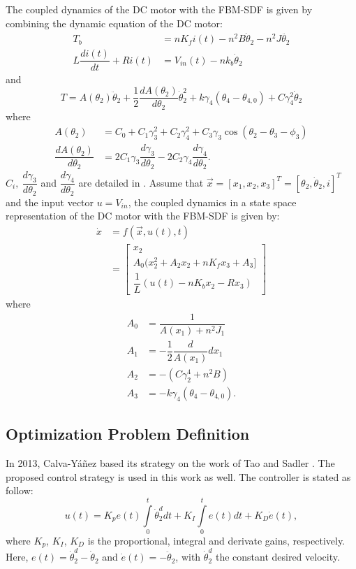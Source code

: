 \documentclass[12pt,letterpape]{article}
\begin{document}
The coupled dynamics of the DC motor with the FBM-SDF is given by combining  the
dynamic equation of the DC motor:
\begin{align}
	T_b &= nK_f i(t) - n^2 B \dot{\theta}_2 - n^2 J \ddot{\theta_2} \\
	L \dfrac{di(t)}{dt} + Ri(t) &= V_{in} (t) - nk_b \dot{\theta}_2
\end{align}
and
$$
	T = A( \theta_2 ) \ddot{\theta}_2 + \frac{1}{2} \dfrac{dA(\theta_2)}{d\theta_2}
	\dot{\theta}_2^2 + k \gamma_4 ( \theta_4 - \theta_{4,0} ) + C \gamma_4^2 \dot{\theta}_2
$$
% 
where
\begin{align}
	A(\theta_2) &=  C_0 + C_1 \gamma_3^2 + C_2 \gamma_4^2 + C_3 \gamma_3 \cos(\theta_2-\theta_3-\phi_3)\\
	\dfrac{dA(\theta_2)}{d\theta_2} &= 2C_1 \gamma_3 \dfrac{d \gamma_3}{d \theta_2} -2C_2 \gamma_4 \dfrac{d \gamma_4}{d \theta_2}.
\end{align}
$C_i,\ \dfrac{d \gamma_3}{d \theta_2}$ and $ \dfrac{d \gamma_4}{d \theta_2 } $ are
detailed in \cite{calva13}.
% 
Assume that $ \vec{x} = [x_1,x_2,x_3]^T = [ \theta_2, \dot{\theta}_2,i ]^T $ and
the input vector $u = V_{in}$, the coupled dynamics in a state space representation
of the DC motor with the FBM-SDF is given by:
\begin{align}
	\dot{x} &= f( \vec{x}, u(t), t ) \\
	&= 
	\begin{bmatrix}
		x_2\\
		A_0( x_2^2 + A_2 x_2 + nK_f x_3 + A_3 ]\\
		\dfrac{1}{L} (u(t) - n K_b x_2 - R x_3)
	\end{bmatrix}
\end{align}
% 
where
\begin{align}
	A_0 &= \dfrac{1}{A(x_1) + n^2 J_1} \\
	A_1 &= -\dfrac{1}{2} \dfrac{d}{A(x_1)}{dx_1} \\
	A_2 &= - (C \gamma_2^4 + n^2 B ) \\
	A_3 &= -k \gamma_4( \theta_4 - \theta_{4,0} ).
\end{align}

\subsection{Optimization Problem Definition} %
\label{sec:optimization_problem_definition}

In 2013, Calva-Y{\'a}{\~n}ez \cite{calva13} based its strategy on the work of Tao
and Sadler \cite{tao95}. The proposed control strategy is used in this work as well.
The controller is stated as follow:
%
%
\begin{equation}
	u(t) =  K_{p} e(t) \int\limits_{0}^{t} \dot{\theta}_2^d dt 
	   			+ K_I\int\limits_{0}^{t} e(t) dt + K_D \dot{e}(t),
\end{equation}
%
where $K_p$, $K_I$, $K_D$ is the proportional, integral and derivate gains, 
respectively. Here, $e(t) = \dot{\theta}_2^d - \dot{\theta}_2 $ and $\dot{e}(t) = - \ddot{\theta}_2 $, with $\dot{\theta}_2^d$ the constant desired velocity. \\
\end{document}

